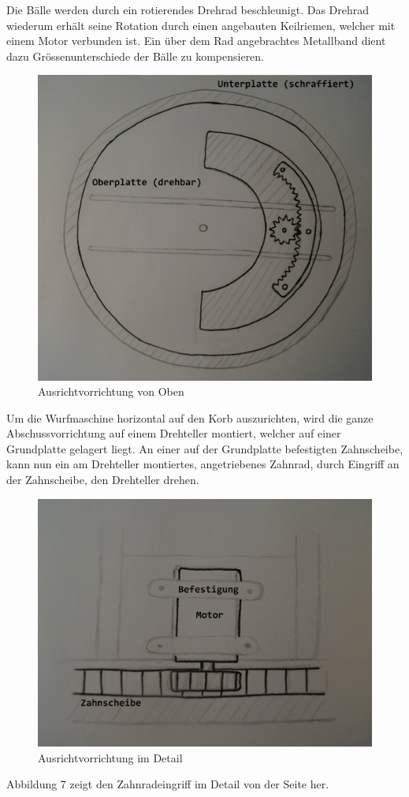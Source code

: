 Die Bälle werden durch ein rotierendes Drehrad beschleunigt. Das Drehrad wiederum erhält seine Rotation durch einen angebauten Keilriemen, welcher mit einem Motor verbunden ist. Ein über dem Rad angebrachtes Metallband dient dazu Grössenunterschiede der Bälle zu kompensieren.
\begin{figure}[h!]
	\centering
	\includegraphics[scale=0.35]{../../fig/Ausrichtvorrichtung_Oben.jpg}
	\caption{Ausrichtvorrichtung von Oben}
\end{figure}
Um die Wurfmaschine horizontal auf den Korb auszurichten, wird die ganze Abschussvorrichtung auf einem Drehteller montiert, welcher auf einer Grundplatte gelagert liegt. An einer auf der Grundplatte befestigten Zahnscheibe, kann nun ein am Drehteller montiertes, angetriebenes Zahnrad, durch Eingriff an der Zahnscheibe, den Drehteller drehen.
\begin{figure}[h!]
	\centering
	\includegraphics[scale=0.35]{../../fig/Ausrichtvorrichtung_Detail.jpg}
	\caption{Ausrichtvorrichtung im Detail}
\end{figure}
Abbildung 7 zeigt den Zahnradeingriff im Detail von der Seite her.
